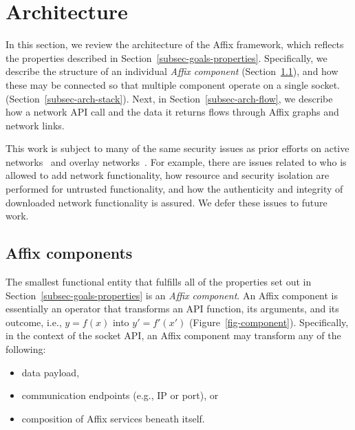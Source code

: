 \section{Architecture}
\label{sec-architecture}



In this section, we review the architecture of the 
Affix framework, which reflects the
properties described in Section~\ref{subsec-goals-properties}. 
Specifically, we describe the 
structure of an individual \textit{Affix component}
(Section~\ref{subsec-arch-components}), 
and how these may be connected so that multiple component operate on 
a single socket.
(Section~\ref{subsec-arch-stack}).
Next, in Section~\ref{subsec-arch-flow},
we describe how a network API call and the data 
it returns flows through Affix graphs and network links.

This work is subject to many of the same security issues as prior efforts
on active networks~\cite{wetherall2002active} and overlay 
networks~\cite{lua2005survey}.   For example,
there are issues related to who is allowed to add network functionality,
how resource and security isolation are performed for untrusted functionality,
and how the authenticity and integrity of downloaded network functionality
is assured.  We defer these issues to future work.

\subsection{Affix components}
\label{subsec-arch-components}

The smallest functional entity that fulfills 
all of the properties set out in Section~\ref{subsec-goals-properties} 
is an \textit{Affix component}. 
An Affix component is essentially an operator that transforms
an API function, its arguments, and its outcome, i.e.,
$y = f(x)$ into $y' = f'(x')$ (Figure~\ref{fig-component}).
Specifically, in the context of the socket API, 
an Affix component may transform any of the following:
\begin{itemize}
\item data payload,
\item communication endpoints (e.g., IP or port), or
\item composition of Affix services beneath itself.
\end{itemize}



